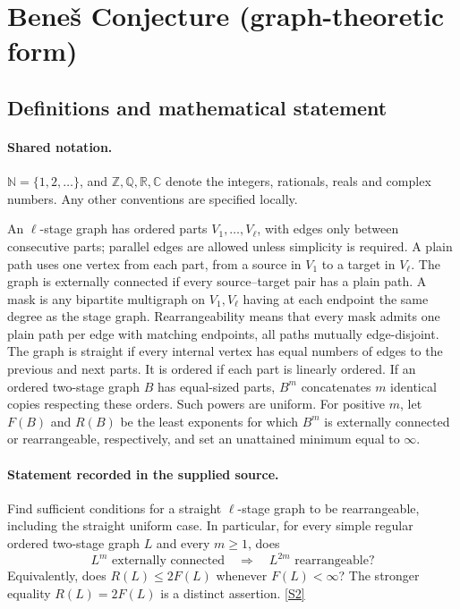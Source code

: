 \documentclass[11pt]{book}
\newcommand{\sref}[2]{\hyperlink{source:#1:#2}{[S#2]}}
\begin{document}
\section{Beneš Conjecture (graph-theoretic form)}\label{statement}

\subsection{Definitions and mathematical statement}

\paragraph{Shared notation.}$\mathbb N=\{1,2,\ldots\}$, and $\mathbb Z,\mathbb Q,\mathbb R,\mathbb C$ denote the integers, rationals, reals and complex numbers. Any other conventions are specified locally.


An $\ell$-stage graph has ordered parts $V_1,\ldots,V_\ell$, with edges only between consecutive parts; parallel edges are allowed unless simplicity is required. A plain path uses one vertex from each part, from a source in $V_1$ to a target in $V_\ell$. The graph is externally connected if every source--target pair has a plain path. A mask is any bipartite multigraph on $V_1,V_\ell$ having at each endpoint the same degree as the stage graph. Rearrangeability means that every mask admits one plain path per edge with matching endpoints, all paths mutually edge-disjoint. The graph is straight if every internal vertex has equal numbers of edges to the previous and next parts. It is ordered if each part is linearly ordered. If an ordered two-stage graph $B$ has equal-sized parts, $B^m$ concatenates $m$ identical copies respecting these orders. Such powers are uniform. For positive $m$, let $F(B)$ and $R(B)$ be the least exponents for which $B^m$ is externally connected or rearrangeable, respectively, and set an unattained minimum equal to $\infty$.
\paragraph{Statement recorded in the supplied source.}
Find sufficient conditions for a straight $\ell$-stage graph to be rearrangeable, including the straight uniform case. In particular, for every simple regular ordered two-stage graph $L$ and every $m\geq1$, does
\[L^m\text{ externally connected}\quad\Longrightarrow\quad L^{2m}\text{ rearrangeable}?\]
Equivalently, does $R(L)\leq2F(L)$ whenever $F(L)<\infty$? The stronger equality $R(L)=2F(L)$ is a distinct assertion. \sref{statement}{2}
\end{document}
